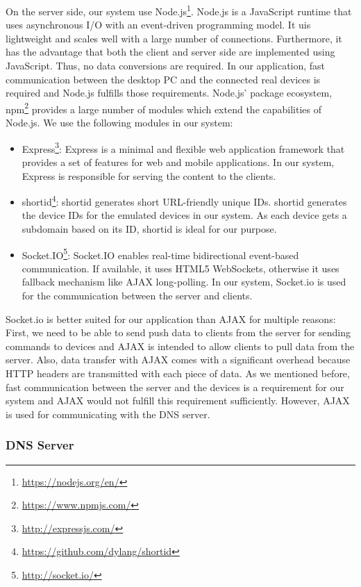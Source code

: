 On the server side, our system use Node.js\footnote{\url{https://nodejs.org/en/}}. Node.js is a JavaScript runtime that uses asynchronous I/O with an event-driven programming model. It uis lightweight and scales well with a large number of connections. Furthermore, it has the advantage that both the client and server side are implemented using JavaScript. Thus, no data conversions are required. In our application, fast communication between the desktop PC and the connected real devices is required and Node.js fulfills those requirements. Node.js' package ecosystem, npm\footnote{\url{https://www.npmjs.com/}} provides a large number of modules which extend the capabilities of Node.js. We use the following modules in our system: 
\begin{itemize}
	\item Express\footnote{\url{http://expressjs.com/}}: Express is a minimal and flexible web application framework that provides a set of features for web and mobile applications. In our system, Express is responsible for serving the content to the clients.
	\item shortid\footnote{\url{https://github.com/dylang/shortid}}: shortid generates short URL-friendly unique IDs. shortid generates the device IDs for the emulated devices in our system. As each device gets a subdomain based on its ID, shortid is ideal for our purpose.
	\item Socket.IO\footnote{\url{http://socket.io/}}: Socket.IO enables real-time bidirectional event-based communication. If available, it uses HTML5 WebSockets, otherwise it uses fallback mechanism like AJAX long-polling. In our system, Socket.io is used for the communication between the server and clients.
\end{itemize}

Socket.io is better suited for our application than AJAX for multiple reasons: First, we need to be able to send push data to clients from the server for sending commands to devices and AJAX is intended to allow clients to pull data from the server. Also, data transfer with AJAX comes with a significant overhead because HTTP headers are transmitted with each piece of data. As we mentioned before, fast communication between the server and the devices is a requirement for our system and AJAX would not fulfill this requirement sufficiently. However, AJAX is used for communicating with the DNS server.

\subsubsection{DNS Server}

